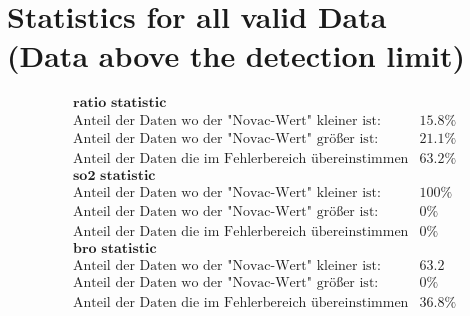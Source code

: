 \documentclass[]{article}
\begin{document}
\section*{Statistics for all valid Data\\ (Data above the detection limit)}

\begin{align*}
& \textbf{ratio statistic}\\
& \text{Anteil der Daten wo der "Novac-Wert" kleiner ist:} & 15.8\%\\
& \text{Anteil der Daten wo der "Novac-Wert" größer ist:} & 21.1\%\\
&\text{Anteil der Daten die im Fehlerbereich übereinstimmen} &  63.2\%\\
& \textbf{so2 statistic}\\
& \text{Anteil der Daten wo der "Novac-Wert" kleiner ist:} &  100\%\\
& \text{Anteil der Daten wo der "Novac-Wert" größer ist:} &  0\% \\
& \text{Anteil der Daten die im Fehlerbereich übereinstimmen} &  0\% \\
& \textbf{bro statistic}\\
& \text{Anteil der Daten wo der "Novac-Wert" kleiner ist:} &  63.2\\
& \text{Anteil der Daten wo der "Novac-Wert" größer ist:} &  0\% \\
&\text{Anteil der Daten die im Fehlerbereich übereinstimmen} &  36.8\%\\
\end{align*}
\end{document}
